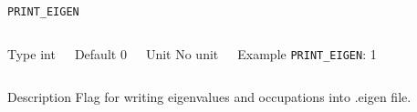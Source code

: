 \begin{frame}[allowframebreaks]{\texttt{PRINT\_EIGEN}} \label{PRINT_EIGEN}
\vspace*{-12pt}
\begin{columns}
\begin{block}{Type}
int
\end{block}

\begin{block}{Default}
0
\end{block}

\begin{block}{Unit}
No unit
\end{block}

\begin{block}{Example}
\texttt{PRINT\_EIGEN}: 1
\end{block}
\end{columns}

\begin{block}{Description}
Flag for writing eigenvalues and occupations into .eigen file.
\end{block}

\end{frame}


